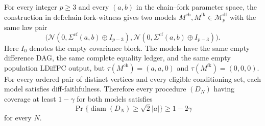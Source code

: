 For every integer \(p\ge3\) and every \((a,b)\) in the chain--fork parameter space, the construction in \(\text{def:chain-fork-witness}\) gives two models \(M^{\mathrm{ch}},M^{\mathrm{fk}}\in\mathcal M_p^{\mathrm{df}}\) with the same law pair
\[
 \bigl(\mathcal N(0,\Sigma^{\mathrm{cf}}(a,b)\oplus I_{p-3}),
 \mathcal N(0,\Sigma^{\mathrm{cf}}(a,b)\oplus I_{p-3})\bigr).
\]
Here \(I_0\) denotes the empty covariance block.  The models have the same empty difference DAG, the same complete equality ledger, and the same empty population LDiffPC output, but \(\tau(M^{\mathrm{ch}})=(a,a,0)\) and \(\tau(M^{\mathrm{fk}})=(0,0,0)\).  For every ordered pair of distinct vertices and every eligible conditioning set, each model satisfies diff-faithfulness.  Therefore every procedure \((D_N)\) having coverage at least \(1-\gamma\) for both models satisfies
\[
 \Pr\{\operatorname{diam}(D_N)\ge\sqrt2|a|\}\ge1-2\gamma
\]
for every \(N\).